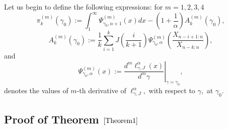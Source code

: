 \documentclass[12pt,reqno,openbib,runningheads,a4paper,portrait]{amsart}%
\begin{document}
\noindent Let us begin to define the following expressions: for $m=1,2,3,4$%
\begin{equation}
\pi_{k}^{\left(  m\right)  }\left(  \gamma_{0}\right)  :=\int_{1}^{\infty}%
\Psi_{\gamma_{0},\alpha+1}^{\left(  m\right)  }\left(  x\right)  dx-\left(
1+\dfrac{1}{\alpha}\right)  A_{k}^{\left(  m\right)  }\left(  \gamma
_{0}\right)  , \label{pi}%
\end{equation}%
\begin{equation}
A_{k}^{\left(  m\right)  }\left(  \gamma_{0}\right)  :=\frac{1}{k}\sum
_{i=1}^{k}J\left(  \dfrac{i}{k+1}\right)  \Psi_{\gamma_{0},\alpha}^{\left(
m\right)  }\left(  \frac{X_{n-i+1:n}}{X_{n-k:n}}\right)  , \label{Am}%
\end{equation}
and
\begin{equation}
\Psi_{\gamma_{0},\alpha}^{\left(  m\right)  }\left(  x\right)  :=\left.
\frac{d^{m}\ell_{\gamma,J}^{\alpha}\left(  x\right)  }{d^{m}\gamma}\right\vert
_{\gamma=\gamma_{0}}, \label{psi-m}%
\end{equation}
denotes the values of $m$-th derivative of $\ell_{\gamma,J}^{\alpha},$ with
respect to $\gamma,$ at $\gamma_{0}.$

\subsection{Proof of Theorem $\ref{Theorem1}$}
\end{document}
